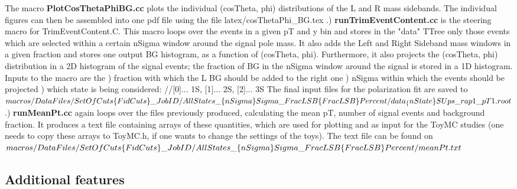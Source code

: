 \documentclass{article}
\begin{document}
The macro {\bf PlotCosThetaPhiBG.cc} plots the individual (cosTheta,
phi) distributions of the L and R mass sidebands. The individual
figures can then be assembled into one pdf file using the file 
latex/cosThetaPhi\_BG.tex
\newline
{}.) {\bf runTrimEventContent.cc} is the steering macro for
TrimEventContent.C. This macro loops over the events in a given pT and
y bin and stores in the "data" TTree only those events which are
selected within a certain nSigma window around the signal pole mass. It
also adds the Left and Right Sideband mass windows in a given fraction
and stores one output BG histogram, as a function of (cosTheta,
phi). Furthermore, it also projects the (cosTheta, phi) distribution
in a 2D histogram of the signal events; the fraction of BG in the
nSigma window around the signal is stored in a 1D histogram. Inputs to
the macro are the 
 \newline   *) fraction with which the L BG should be added to the right one
 \newline   *) nSigma within which the events should be projected
 \newline   *) which state is being considered: //[0]... 1S, [1]... 2S, [2]... 3S
The final input files for the polarization fit are saved to
\newline
\newline
$macros/DataFiles/SetOfCuts\{FidCuts\}\_JobID/\\AllStates\_\{nSigma\}Sigma\_FracLSB\{FracLSB\}Percent/data_\{nState\}SUps\_rap1\_pT1.root$
\newline
{}.) {\bf runMeanPt.cc} again loops over the files previously produced, calculating the mean pT, number of signal events and background fraction. It produces a text file containing arrays of these quantities, which are used for plotting and as input for the ToyMC studies (one needs to copy these arrays to ToyMC.h, if one wants to change the settings of the toys). The text file can be found on
\newline
\newline
$macros/DataFiles/SetOfCuts\{FidCuts\}\_JobID/\\AllStates\_\{nSigma\}Sigma\_FracLSB\{FracLSB\}Percent/meanPt.txt$


\subsection{Additional features}
\end{document}
